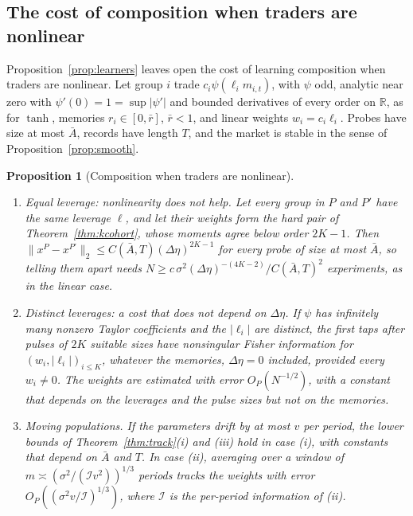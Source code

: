 \documentclass[12pt]{article}
\newtheorem{proposition}[theorem]{Proposition}
\theoremstyle{definition}
\theoremstyle{remark}
\begin{document}
\subsection{The cost of composition when traders are nonlinear}

Proposition~\ref{prop:learners} leaves open the cost of learning composition when traders are nonlinear. Let group $i$ trade $c_i\psi(\ell_im_{i,t})$, with $\psi$ odd, analytic near zero with $\psi'(0)=1=\sup|\psi'|$ and bounded derivatives of every order on $\mathbb R$, as for $\tanh$, memories $r_i\in[0,\bar r]$, $\bar r<1$, and linear weights $w_i=c_i\ell_i$. Probes have size at most $\bar A$, records have length $T$, and the market is stable in the sense of Proposition~\ref{prop:smooth}.

\begin{proposition}[Composition when traders are nonlinear]\label{prop:nlcost}
\begin{enumerate}[label=(\roman*),itemsep=1pt]
\item \emph{Equal leverage: nonlinearity does not help.} Let every group in $P$ and $P'$ have the same leverage $\ell$, and let their weights form the hard pair of Theorem~\ref{thm:kcohort}, whose moments agree below order $2K-1$. Then $\|x^P-x^{P'}\|_2\le C(\bar A,T)(\Delta\eta)^{2K-1}$ for every probe of size at most $\bar A$, so telling them apart needs $N\ge c\,\sigma^2(\Delta\eta)^{-(4K-2)}/C(\bar A,T)^2$ experiments, as in the linear case.
\item \emph{Distinct leverages: a cost that does not depend on $\Delta\eta$.} If $\psi$ has infinitely many nonzero Taylor coefficients and the $|\ell_i|$ are distinct, the first taps after pulses of $2K$ suitable sizes have nonsingular Fisher information for $(w_i,|\ell_i|)_{i\le K}$, whatever the memories, $\Delta\eta=0$ included, provided every $w_i\ne0$. The weights are estimated with error $O_P(N^{-1/2})$, with a constant that depends on the leverages and the pulse sizes but not on the memories.
\item \emph{Moving populations.} If the parameters drift by at most $v$ per period, the lower bounds of Theorem~\ref{thm:track}(i) and (iii) hold in case (i), with constants that depend on $\bar A$ and $T$. In case (ii), averaging over a window of $m\asymp(\sigma^2/(\mathcal Iv^2))^{1/3}$ periods tracks the weights with error $O_P((\sigma^2v/\mathcal I)^{1/3})$, where $\mathcal I$ is the per-period information of (ii).
\end{enumerate}
\end{proposition}
\end{document}
